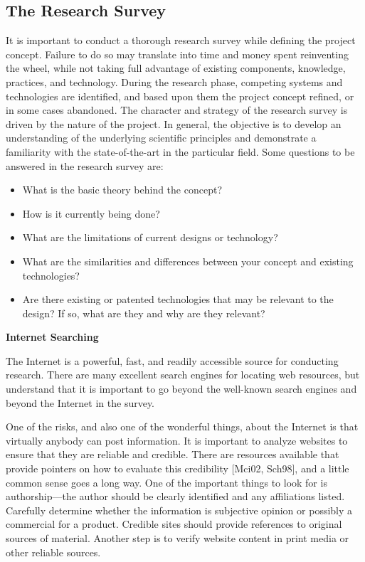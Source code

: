 \subsection{The Research Survey}\label{the-research-survey}

It is important to conduct a thorough research survey while defining the
project concept. Failure to do so may translate into time and money
spent reinventing the wheel, while not taking full advantage of existing
components, knowledge, practices, and technology. During the research
phase, competing systems and technologies are identified, and based upon
them the project concept refined, or in some cases abandoned. The
character and strategy of the research survey is driven by the nature of
the project. In general, the objective is to develop an understanding of
the underlying scientific principles and demonstrate a familiarity with
the state-of-the-art in the particular field. Some questions to be
answered in the research survey are:

\begin{itemize}
\item
  What is the basic theory behind the concept?
\item
  How is it currently being done?
\item
  What are the limitations of current designs or technology?
\item
  What are the similarities and differences between your concept and
  existing technologies?
\item
  Are there existing or patented technologies that may be relevant to
  the design? If so, what are they and why are they relevant?
\end{itemize}

\textbf{Internet Searching}

The Internet is a powerful, fast, and readily accessible source for
conducting research. There are many excellent search engines for
locating web resources, but understand that it is important to go beyond
the well-known search engines and beyond the Internet in the survey.

One of the risks, and also one of the wonderful things, about the
Internet is that virtually anybody can post information. It is important
to analyze websites to ensure that they are reliable and credible. There
are resources available that provide pointers on how to evaluate this
credibility {[}Mci02, Sch98{]}, and a little common sense goes a long
way. One of the important things to look for is authorship---the author
should be clearly identified and any affiliations listed. Carefully
determine whether the information is subjective opinion or possibly a
commercial for a product. Credible sites should provide references to
original sources of material. Another step is to verify website content
in print media or other reliable sources.

